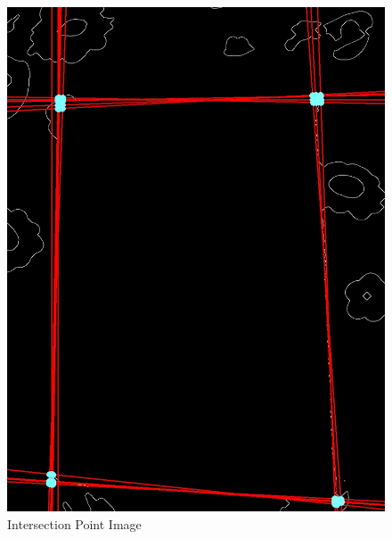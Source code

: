 \begin{enumerate}
\begin{figure}[h!]
\begin{minipage}[b]{0.30\linewidth}
            \includegraphics[width=\linewidth]{output/intersection_point_output.jpg}
            \caption{Intersection Point Image}
        \end{minipage}
        
    \end{figure}
    

\end{enumerate}
